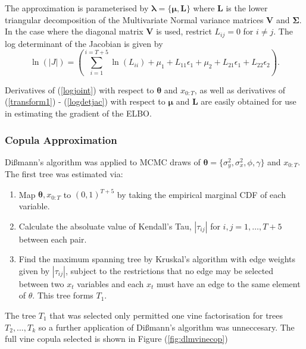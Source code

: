 \documentclass[12pt,a4paper]{article}%
\numberwithin{equation}{section}
\begin{document}
The approximation is parameterised by $\boldsymbol{\lambda} = \{ \boldsymbol{\mu}, \textbf{L} \}$ where $\textbf{L}$ is the lower triangular decomposition of the Multivariate Normal variance matrices $\textbf{V}$ and $\boldsymbol{\Sigma}$. In the case where the diagonal matrix $\textbf{V}$ is used, restrict $L_{ij} = 0$ for $i \neq j$.
The log determinant of the Jacobian is given by
\begin{equation}
\label{logdetjac}
\ln(|J|) = \left(\sum_{i = 1}^{i = T+5} \ln(L_{ii}) + \mu_1 + L_{11} \epsilon_1 + \mu_2 + L_{21} \epsilon_1 + L_{22} \epsilon_2\right).  
\end{equation}

Derivatives of (\ref{logjoint}) with respect to $\boldsymbol{\theta}$ and $x_{0:T}$, as well as derivatives of (\ref{transform1}) - (\ref{logdetjac}) with respect to $\boldsymbol{\mu}$ and $\textbf{L}$ are easily obtained for use in estimating the gradient of the ELBO.

\subsubsection{Copula Approximation}

Di{\ss}mann's algorithm was applied to MCMC draws of $\boldsymbol{\theta} = \{ \sigma^2_y, \sigma^2_x, \phi, \gamma \}$ and $x_{0:T}$. The first tree was estimated via:
\begin{enumerate}
\item Map $\boldsymbol{\theta}, x_{0:T}$ to $(0, 1)^{T+5}$ by taking the empirical marginal CDF of each variable.
\item Calculate the absoluate value of Kendall's Tau, $|\tau_{ij}|$ for  $i, j = 1, \dots, T+5$ between each pair.
\item Find the maximum spanning tree by Kruskal's algorithm with edge weights given by $|\tau_{ij}|$, subject to the restrictions that no edge may be selected between two $x_t$ variables and each $x_t$ must have an edge to the same element of $\theta$. This tree forms $T_1$.
\end{enumerate}
The tree $T_1$ that was selected only permitted one vine factorisation for trees $T_2, \dots, T_k$ so a further application of Di{\ss}mann's algorithm was unneccesary. The full vine copula selected is shown in Figure (\ref{fig:dlmvinecop})
\end{document}
